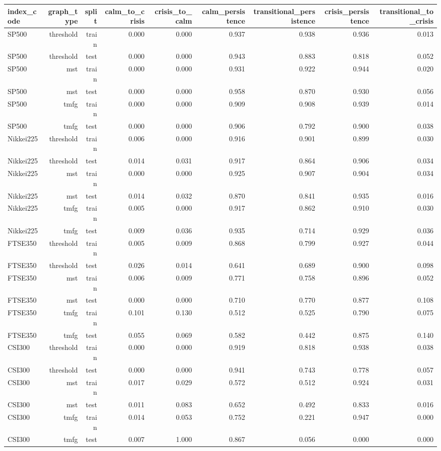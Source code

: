 \begin{tabular}{lrrrrrrrr}
\toprule
index\_code & graph\_type & split & calm\_to\_crisis & crisis\_to\_calm & calm\_persistence & transitional\_persistence & crisis\_persistence & transitional\_to\_crisis \\
\midrule
SP500 & threshold & train & 0.000 & 0.000 & 0.937 & 0.938 & 0.936 & 0.013 \\
SP500 & threshold & test & 0.000 & 0.000 & 0.943 & 0.883 & 0.818 & 0.052 \\
SP500 & mst & train & 0.000 & 0.000 & 0.931 & 0.922 & 0.944 & 0.020 \\
SP500 & mst & test & 0.000 & 0.000 & 0.958 & 0.870 & 0.930 & 0.056 \\
SP500 & tmfg & train & 0.000 & 0.000 & 0.909 & 0.908 & 0.939 & 0.014 \\
SP500 & tmfg & test & 0.000 & 0.000 & 0.906 & 0.792 & 0.900 & 0.038 \\
Nikkei225 & threshold & train & 0.006 & 0.000 & 0.916 & 0.901 & 0.899 & 0.030 \\
Nikkei225 & threshold & test & 0.014 & 0.031 & 0.917 & 0.864 & 0.906 & 0.034 \\
Nikkei225 & mst & train & 0.000 & 0.000 & 0.925 & 0.907 & 0.904 & 0.034 \\
Nikkei225 & mst & test & 0.014 & 0.032 & 0.870 & 0.841 & 0.935 & 0.016 \\
Nikkei225 & tmfg & train & 0.005 & 0.000 & 0.917 & 0.862 & 0.910 & 0.030 \\
Nikkei225 & tmfg & test & 0.009 & 0.036 & 0.935 & 0.714 & 0.929 & 0.036 \\
FTSE350 & threshold & train & 0.005 & 0.009 & 0.868 & 0.799 & 0.927 & 0.044 \\
FTSE350 & threshold & test & 0.026 & 0.014 & 0.641 & 0.689 & 0.900 & 0.098 \\
FTSE350 & mst & train & 0.006 & 0.009 & 0.771 & 0.758 & 0.896 & 0.052 \\
FTSE350 & mst & test & 0.000 & 0.000 & 0.710 & 0.770 & 0.877 & 0.108 \\
FTSE350 & tmfg & train & 0.101 & 0.130 & 0.512 & 0.525 & 0.790 & 0.075 \\
FTSE350 & tmfg & test & 0.055 & 0.069 & 0.582 & 0.442 & 0.875 & 0.140 \\
CSI300 & threshold & train & 0.000 & 0.000 & 0.919 & 0.818 & 0.938 & 0.038 \\
CSI300 & threshold & test & 0.000 & 0.000 & 0.941 & 0.743 & 0.778 & 0.057 \\
CSI300 & mst & train & 0.017 & 0.029 & 0.572 & 0.512 & 0.924 & 0.031 \\
CSI300 & mst & test & 0.011 & 0.083 & 0.652 & 0.492 & 0.833 & 0.016 \\
CSI300 & tmfg & train & 0.014 & 0.053 & 0.752 & 0.221 & 0.947 & 0.000 \\
CSI300 & tmfg & test & 0.007 & 1.000 & 0.867 & 0.056 & 0.000 & 0.000 \\
\bottomrule
\end{tabular}
